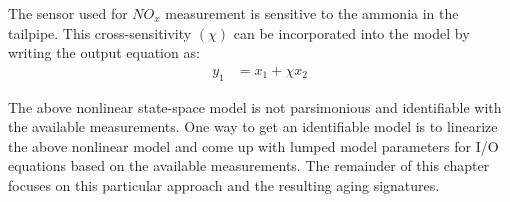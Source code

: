 The sensor used for $NO_x$ measurement is sensitive to the ammonia in the
tailpipe. This cross-sensitivity $(\chi)$ can be incorporated into the model by writing
the output equation as:
\begin{align}\label{eqn::ctrl_out}
    y_1 &= x_1 + \chi x_2
\end{align}


 The above nonlinear state-space model is not parsimonious and identifiable with the available measurements. One way to get an identifiable model is to linearize the above nonlinear model and come up with lumped model parameters for I/O equations based on the available measurements. The remainder of this chapter focuses on this particular approach and the resulting aging signatures.
